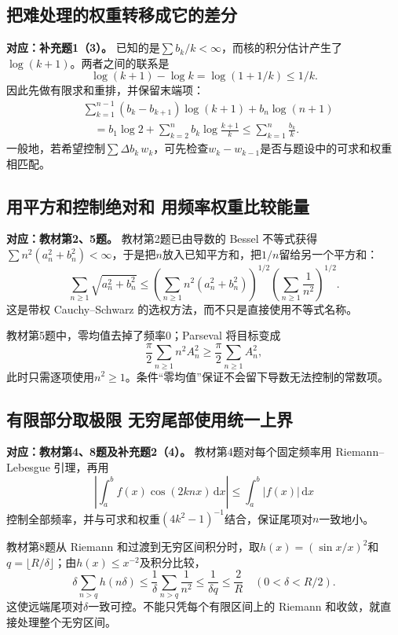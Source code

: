 \documentclass[11pt,a4paper]{ctexart}
\newcommand{\dd}{\,\mathrm d}
\begin{document}
\subsection{把难处理的权重转移成它的差分}
\noindent\textbf{对应：补充题1（3）。}
已知的是$\sum b_k/k<\infty$，而核的积分估计产生了$\log(k+1)$。两者之间的联系是
\[
 \log(k+1)-\log k=\log(1+1/k)\le1/k.
\]
因此先做有限求和重排，并保留末端项：
\begin{align*}
 &\sum_{k=1}^{n-1}(b_k-b_{k+1})\log(k+1)+b_n\log(n+1)\\
 &\hspace{1em}=b_1\log2+\sum_{k=2}^nb_k\log\frac{k+1}{k}
 \le\sum_{k=1}^n\frac{b_k}{k}.
\end{align*}
一般地，若希望控制$\sum\Delta b_k\,w_k$，可先检查$w_k-w_{k-1}$是否与题设中的可求和权重相匹配。

\subsection{用平方和控制绝对和 用频率权重比较能量}
\noindent\textbf{对应：教材第2、5题。}
教材第2题已由导数的 Bessel 不等式获得$\sum n^2(a_n^2+b_n^2)<\infty$，于是把$n$放入已知平方和，把$1/n$留给另一个平方和：
\[
 \sum_{n\ge1}\sqrt{a_n^2+b_n^2}
 \le\left(\sum_{n\ge1}n^2(a_n^2+b_n^2)\right)^{1/2}
     \left(\sum_{n\ge1}\frac1{n^2}\right)^{1/2}.
\]
这是带权 Cauchy--Schwarz 的选权方法，而不只是直接使用不等式名称。

教材第5题中，零均值去掉了频率$0$；Parseval 将目标变成
\[
 \frac\pi2\sum_{n\ge1}n^2A_n^2
 \ge\frac\pi2\sum_{n\ge1}A_n^2,
\]
此时只需逐项使用$n^2\ge1$。条件“零均值”保证不会留下导数无法控制的常数项。

\subsection{有限部分取极限 无穷尾部使用统一上界}
\noindent\textbf{对应：教材第4、8题及补充题2（4）。}
教材第4题对每个固定频率用 Riemann--Lebesgue 引理，再用
\[
 \left|\int_a^bf(x)\cos(2knx)\dd x\right|\le\int_a^b|f(x)|\dd x
\]
控制全部频率，并与可求和权重$(4k^2-1)^{-1}$结合，保证尾项对$n$一致地小。

教材第8题从 Riemann 和过渡到无穷区间积分时，取$h(x)=(\sin x/x)^2$和$q=\lfloor R/\delta\rfloor$；由$h(x)\le x^{-2}$及积分比较，
\[
 \delta\sum_{n>q}h(n\delta)
 \le\frac1\delta\sum_{n>q}\frac1{n^2}
 \le\frac1{\delta q}\le\frac2R
 \quad(0<\delta<R/2).
\]
这使远端尾项对$\delta$一致可控。不能只凭每个有限区间上的 Riemann 和收敛，就直接处理整个无穷区间。
\end{document}
